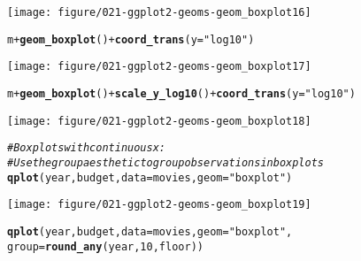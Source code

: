 \documentclass[a4paper,titlepage]{tufte-handout}\usepackage[]{graphicx}\usepackage[]{color}
\makeatletter
\def\maxwidth{ %
  \ifdim\Gin@nat@width>\linewidth
    \linewidth
  \else
    \Gin@nat@width
  \fi
}
\newcommand{\hlnum}[1]{\textcolor[rgb]{0.686,0.059,0.569}{#1}}%
\newcommand{\hlstr}[1]{\textcolor[rgb]{0.192,0.494,0.8}{#1}}%
\newcommand{\hlcom}[1]{\textcolor[rgb]{0.678,0.584,0.686}{\textit{#1}}}%
\newcommand{\hlopt}[1]{\textcolor[rgb]{0,0,0}{#1}}%
\newcommand{\hlstd}[1]{\textcolor[rgb]{0.345,0.345,0.345}{#1}}%
\newcommand{\hlkwc}[1]{\textcolor[rgb]{0.333,0.667,0.333}{#1}}%
\newcommand{\hlkwd}[1]{\textcolor[rgb]{0.737,0.353,0.396}{\textbf{#1}}}%
\newenvironment{kframe}{%
 \def\at@end@of@kframe{}%
 \ifinner\ifhmode%
  \def\at@end@of@kframe{\end{minipage}}%
  \begin{minipage}{\columnwidth}%
 \fi\fi%
 \def\FrameCommand##1{\hskip\@totalleftmargin \hskip-\fboxsep
 \colorbox{shadecolor}{##1}\hskip-\fboxsep
     \hskip-\linewidth \hskip-\@totalleftmargin \hskip\columnwidth}%
 \MakeFramed {\advance\hsize-\width
   \@totalleftmargin\z@ \linewidth\hsize
   \@setminipage}}%
 {\par\unskip\endMakeFramed%
 \at@end@of@kframe}
\newenvironment{knitrout}{}{} %
\makeatother
\begin{document}
\begin{knitrout}
\begin{kframe}
{\ttfamily\noindent\color{warningcolor}{\#\# Warning: position\_dodge requires constant width: output may be incorrect}}\end{kframe}
\texttt{[image: figure/021-ggplot2-geoms-geom\_boxplot16]} 
\begin{kframe}\begin{alltt}
\hlstd{m} \hlopt{+} \hlkwd{geom_boxplot}\hlstd{()} \hlopt{+} \hlkwd{coord_trans}\hlstd{(}\hlkwc{y} \hlstd{=} \hlstr{"log10"}\hlstd{)}
\end{alltt}


{\ttfamily\noindent\color{warningcolor}{\#\# Warning: position\_dodge requires constant width: output may be incorrect}}\end{kframe}
\texttt{[image: figure/021-ggplot2-geoms-geom\_boxplot17]} 
\begin{kframe}\begin{alltt}
\hlstd{m} \hlopt{+} \hlkwd{geom_boxplot}\hlstd{()} \hlopt{+} \hlkwd{scale_y_log10}\hlstd{()} \hlopt{+} \hlkwd{coord_trans}\hlstd{(}\hlkwc{y} \hlstd{=} \hlstr{"log10"}\hlstd{)}
\end{alltt}


{\ttfamily\noindent\color{warningcolor}{\#\# Warning: position\_dodge requires constant width: output may be incorrect}}\end{kframe}
\texttt{[image: figure/021-ggplot2-geoms-geom\_boxplot18]} 
\begin{kframe}\begin{alltt}
\hlcom{# Boxplots with continuous x:}
\hlcom{# Use the group aesthetic to group observations in boxplots}
\hlkwd{qplot}\hlstd{(year, budget,} \hlkwc{data} \hlstd{= movies,} \hlkwc{geom} \hlstd{=} \hlstr{"boxplot"}\hlstd{)}
\end{alltt}


{\ttfamily\noindent\color{warningcolor}{\#\# Warning: Removed 53573 rows containing non-finite values (stat\_boxplot).}}\end{kframe}
\texttt{[image: figure/021-ggplot2-geoms-geom\_boxplot19]} 
\begin{kframe}\begin{alltt}
\hlkwd{qplot}\hlstd{(year, budget,} \hlkwc{data} \hlstd{= movies,} \hlkwc{geom} \hlstd{=} \hlstr{"boxplot"}\hlstd{,}
  \hlkwc{group} \hlstd{=} \hlkwd{round_any}\hlstd{(year,} \hlnum{10}\hlstd{, floor))}
\end{alltt}



\end{kframe}
\end{knitrout}
\end{document}
